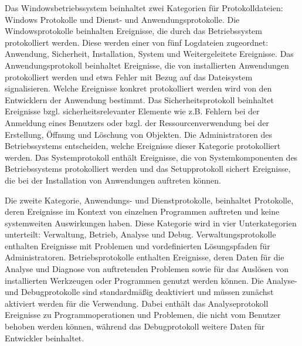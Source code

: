 Das Windowsbetriebssystem beinhaltet zwei Kategorien für Protokolldateien: Windows Protokolle und Dienst- und Anwendungsprotokolle. 
Die Windowsprotokolle beinhalten Ereignisse, die durch das Betriebssystem protokolliert werden. Diese werden einer von fünf Logdateien zugeordnet: Anwendung, Sicherheit, Installation, System und Weitergeleitete Ereignisse.
Das Anwendungsprotokoll beinhaltet Ereignisse, die von installierten Anwendungen protokolliert werden und etwa Fehler mit Bezug auf das Dateisystem signalisieren. Welche Ereignisse konkret protokolliert werden wird von den Entwicklern der Anwendung bestimmt. 
Das Sicherheitsprotokoll beinhaltet Ereignisse bzgl. sicherheitsrelevanter Elemente wie z.B. Fehlern bei der Anmeldung eines Benutzers oder bzgl. der Ressourcenverwendung bei der Erstellung, Öffnung und Löschung von Objekten. Die Administratoren des Betriebssystems entscheiden, welche Ereignisse dieser Kategorie protokolliert werden. 
Das Systemprotokoll enthält Ereignisse, die von Systemkomponenten des Betriebssystems protokolliert werden und das Setupprotokoll sichert Ereignisse, die bei der Installation von Anwendungen auftreten können.

Die zweite Kategorie, Anwendungs- und Dienstprotokolle, beinhaltet Protokolle, deren Ereignisse im Kontext von einzelnen Programmen auftreten und keine systemweiten Auswirkungen haben. Diese Kategorie wird in vier Unterkategorien unterteilt: Verwaltung, Betrieb, Analyse und Debug. Verwaltungsprotokolle enthalten Ereignisse mit Problemen und vordefinierten Lösungspfaden für Administratoren. Betriebsprotokolle enthalten Ereignisse, deren Daten für die Analyse und Diagnose von auftretenden Problemen sowie für das Auslösen von installierten Werkzeugen oder Programmen genutzt werden können. Die Analyse- und Debugprotokolle sind standardmäßig deaktiviert und müssen zunächst aktiviert werden für die Verwendung. Dabei enthält das Analyseprotokoll Ereignisse zu Programmoperationen und Problemen, die nicht vom Benutzer behoben werden können, während das Debugprotokoll weitere Daten für Entwickler beinhaltet.

